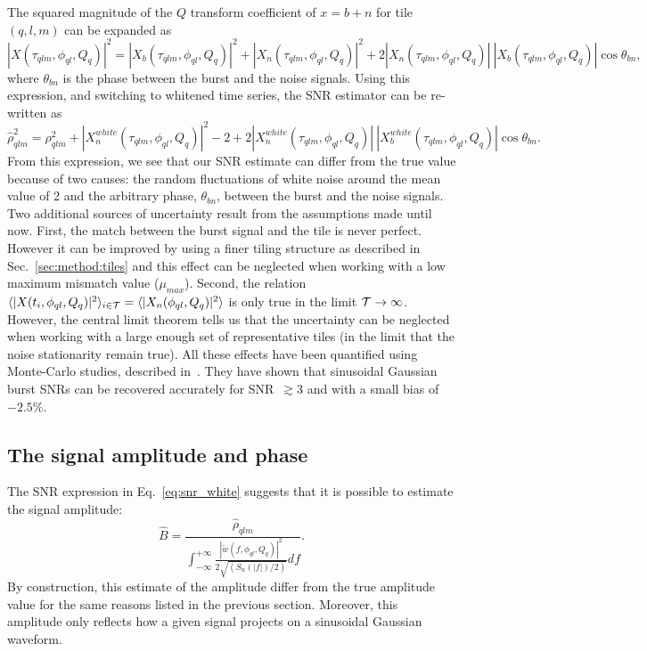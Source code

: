 The squared magnitude of the $Q$ transform coefficient of $x=b+n$ for tile $(q,l,m)$ can be expanded as
\begin{equation}
  |X(\tau_{qlm}, \phi_{ql}, Q_q)|^2 = |X_b(\tau_{qlm}, \phi_{ql}, Q_q)|^2 + |X_n(\tau_{qlm}, \phi_{ql}, Q_q)|^2 + 2|X_n(\tau_{qlm}, \phi_{ql}, Q_q)|\ |X_b(\tau_{qlm}, \phi_{ql}, Q_q)|\cos{\theta_{bn}},
\end{equation}
where $\theta_{bn}$ is the phase between the burst and the noise signals. Using this expression, and switching to whitened time series, the SNR estimator can be re-written as
\begin{equation}
  \hat{\rho}_{qlm}^2  =
  \rho_{qlm}^2
  + |X^{white}_n(\tau_{qlm}, \phi_{ql}, Q_q)|^2 -2
  + 2|X^{white}_n(\tau_{qlm}, \phi_{ql}, Q_q)|\ |X^{white}_b(\tau_{qlm}, \phi_{ql}, Q_q)| \cos{\theta_{bn}}.
\end{equation}
From this expression, we see that our SNR estimate can differ from the true value because of two causes: the random fluctuations of white noise around the mean value of 2 and the arbitrary phase, $\theta_{bn}$, between the burst and the noise signals. Two additional sources of uncertainty result from the assumptions made until now. First, the match between the burst signal and the tile is never perfect. However it can be improved by using a finer tiling structure as described in Sec.~\ref{sec:method:tiles} and this effect can be neglected when working with a low maximum mismatch value ($\mu_{max}$). Second, the relation $\langle |X(t_i, \phi_{ql}, Q_q)|^2 \rangle_{i\in \cal{T}}=\langle |X_n(\phi_{ql}, Q_q)|^2 \rangle$ is only true in the limit $\cal{T}\rightarrow \infty$. However, the central limit theorem tells us that the uncertainty can be neglected when working with a large enough set of representative tiles (in the limit that the noise stationarity remain true). All these effects have been quantified using Monte-Carlo studies, described in~\cite{Chatterji:2004}. They have shown that sinusoidal Gaussian burst SNRs can be recovered accurately for SNR~$\gtrsim 3$ and with a small bias of $-2.5\%$. 


\subsection{The signal amplitude and phase} \label{sec:method:ampphase}

The SNR expression in Eq.~\ref{eq:snr_white} suggests that it is possible to estimate the signal amplitude:
\begin{equation}
  \hat{B} = \frac{\hat{\rho}_{qlm}}{\int_{-\infty}^{+\infty}{\frac{|\tilde{w}(f,\phi_{ql},Q_q)|^2}{2\sqrt{(S_n(|f|)/2)}}df}}.
  \label{eq:amplitude}
\end{equation}
By construction, this estimate of the amplitude differ from the true amplitude value for the same reasons listed in the previous section. Moreover, this amplitude only reflects how a given signal projects on a sinusoidal Gaussian waveform.

